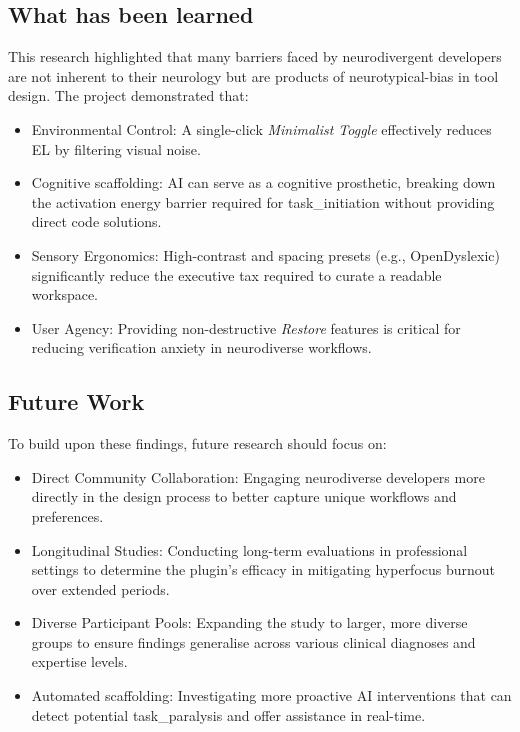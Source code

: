 \subsection{What has been learned}
This research highlighted that many barriers faced by \gls{neurodivergent} developers are not inherent to their neurology but are products of 
\gls{neurotypical-bias} in tool design. The project demonstrated that:
\begin{itemize}
    \item Environmental Control: A single-click \textit{Minimalist Toggle} effectively reduces \gls{EL} by filtering visual noise.
    \item Cognitive \Gls{scaffolding}: \gls{AI} can serve as a cognitive prosthetic, breaking down the activation energy barrier required for \gls{task_initiation} without 
    providing direct code solutions.
    \item Sensory Ergonomics: High-contrast and spacing presets (e.g., OpenDyslexic) significantly reduce the executive tax required to curate a readable workspace.
    \item User Agency: Providing non-destructive \textit{Restore} features is critical for reducing verification anxiety in \gls{neurodiverse} workflows.
\end{itemize}

\subsection{Future Work}
To build upon these findings, future research should focus on:
\begin{itemize}
    \item Direct Community Collaboration: Engaging \gls{neurodiverse} developers more directly in the design process to better capture unique workflows and preferences.
    \item Longitudinal Studies: Conducting long-term evaluations in professional settings to determine the plugin's efficacy in mitigating \gls{hyperfocus} burnout over extended periods.
    \item Diverse Participant Pools: Expanding the study to larger, more diverse groups to ensure findings generalise across various clinical diagnoses and expertise levels.
    \item Automated \Gls{scaffolding}: Investigating more proactive \gls{AI} interventions that can detect potential \gls{task_paralysis} and offer assistance in real-time.
\end{itemize}